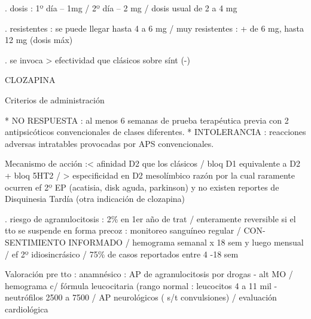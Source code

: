 . dosis : 1º día – 1mg / 2º día – 2 mg / dosis usual de 2 a 4 mg

. resistentes : se puede llegar hasta 4 a 6 mg / muy resistentes : + de 6 mg, hasta 12 mg (dosis máx)

. se invoca > efectividad que clásicos sobre sínt (-)

CLOZAPINA

Criterios de administración

* NO RESPUESTA : al menos 6 semanas de prueba terapéutica previa con 2 antipsicóticos convencionales de clases diferentes.
* INTOLERANCIA : reacciones adversas intratables provocadas por APS convencionales.

Mecanismo de acción :< afinidad D2 que los clásicos / bloq D1 equivalente a D2 + bloq 5HT2 / > especificidad en D2 mesolímbico razón por la cual raramente ocurren ef 2º EP (acatisia, disk aguda, parkinson) y no existen reportes de Disquinesia Tardía (otra indicación de clozapina)

. riesgo de agranulocitosis : 2\% en 1er año de trat / enteramente reversible si el tto se suspende en forma precoz : monitoreo sanguíneo regular / CON-SENTIMIENTO INFORMADO / hemograma semanal x 18 sem y luego mensual / ef 2º idiosincrásico / 75\% de casos reportados entre 4 -18 sem

Valoración pre tto : anamnésico : AP de agranulocitosis por drogas - alt MO / hemograma c/ fórmula leucocitaria (rango normal : leucocitos 4 a 11 mil - neutrófilos 2500 a 7500 / AP neurológicos ( s/t convulsiones) / evaluación cardiológica


